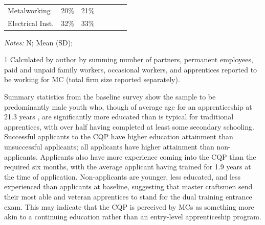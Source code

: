 \documentclass[
  a4paper, twoside, 12pt]{book}
\begin{document}
\begin{singlespacing}
\begin{table}[H]
{\begin{threeparttable}
\begin{tabular}[t]{lcccccc}
\hspace{1em}\hspace{1em}Metalworking & 20\% & 21\% &  &  &  & \\
\hspace{1em}\hspace{1em}Electrical Inst. & 32\% & 33\% &  &  &  & \\
\bottomrule
\end{tabular}
\begin{tablenotes}
\small
\item \textit{Notes:} N; Mean (SD); %
\item[1] Calculated by author by summing number of partners, permanent employees, paid and unpaid family workers, occasional workers, and apprentices reported to be working for MC (total firm size reported separately).
\end{tablenotes}
\end{threeparttable}}
\end{table}
\end{singlespacing}

Summary statistics from the baseline survey show the sample to be predominantly male youth who, though of average age for an apprenticeship at 21.3 years \autocite{ilo2022}, are significantly more educated than is typical for traditional apprentices, with over half having completed at least some secondary schooling. Successful applicants to the CQP have higher education attainment than unsuccessful applicants; all applicants have higher attainment than non-applicants. Applicants also have more experience coming into the CQP than the required six months, with the average applicant having trained for 1.9 years at the time of application. Non-applicants are younger, less educated, and less experienced than applicants at baseline, suggesting that master craftsmen send their most able and veteran apprentices to stand for the dual training entrance exam. This may indicate that the CQP is perceived by MCs as something more akin to a continuing education rather than an entry-level apprenticeship program.
\end{document}
